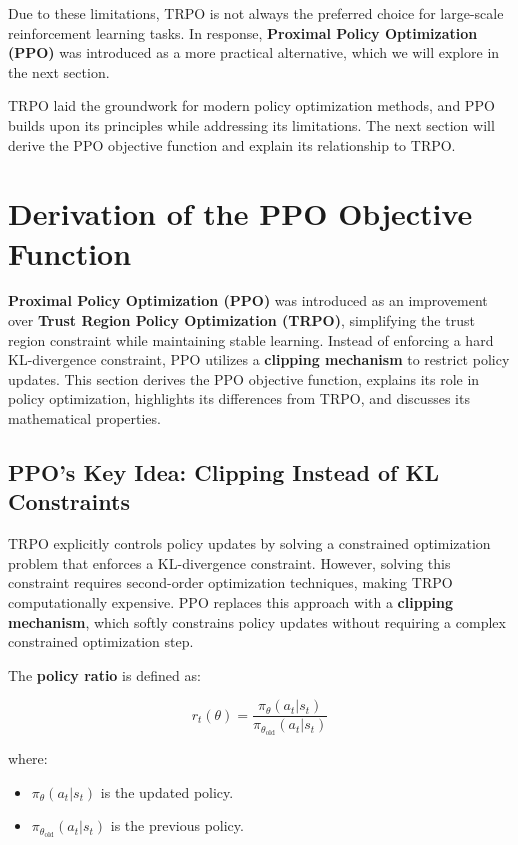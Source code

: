 \documentclass[12pt]{extreport} %
\begin{document}
Due to these limitations, TRPO is not always the preferred choice for large-scale reinforcement learning tasks. In response, \textbf{Proximal Policy Optimization (PPO)} was introduced as a more practical alternative, which we will explore in the next section.

TRPO laid the groundwork for modern policy optimization methods, and PPO builds upon its principles while addressing its limitations. The next section will derive the PPO objective function and explain its relationship to TRPO.

\section{\textbf{Derivation of the PPO Objective Function}}

\textbf{Proximal Policy Optimization (PPO)} was introduced as an improvement over \textbf{Trust Region Policy Optimization (TRPO)}, simplifying the trust region constraint while maintaining stable learning. Instead of enforcing a hard KL-divergence constraint, PPO utilizes a \textbf{clipping mechanism} to restrict policy updates. This section derives the PPO objective function, explains its role in policy optimization, highlights its differences from TRPO, and discusses its mathematical properties.

\subsection{\textbf{PPO's Key Idea: Clipping Instead of KL Constraints}}

TRPO explicitly controls policy updates by solving a constrained optimization problem that enforces a KL-divergence constraint. However, solving this constraint requires second-order optimization techniques, making TRPO computationally expensive. PPO replaces this approach with a \textbf{clipping mechanism}, which softly constrains policy updates without requiring a complex constrained optimization step.

The \textbf{policy ratio} is defined as:

\begin{equation}
r_t(\theta) = \frac{\pi_{\theta}(a_t | s_t)}{\pi_{\theta_{\text{old}}}(a_t | s_t)}
\end{equation}

where:
\begin{itemize}
    \item \( \pi_{\theta}(a_t | s_t) \) is the updated policy.
    \item \( \pi_{\theta_{\text{old}}}(a_t | s_t) \) is the previous policy.
\end{itemize}
\end{document}
